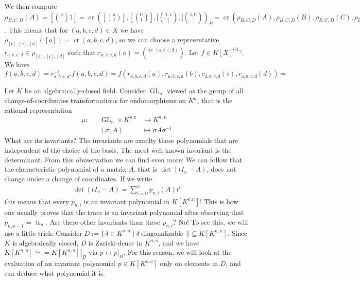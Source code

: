 \begin{example}
  We then compute $\rho_{B,C,D} (A) = [\binom{a},1] = \operatorname{cr}([\binom{a}{1}],[\binom{0}{1}],[\binom{1,1}],[\binom{1,0}])_P = \operatorname{cr}(\rho_{B,C,D}(A),\rho_{B,C,D}(B),\rho_{B,C,D}(C),\rho_{B,C,D}(D))_P = \operatorname{cr}(A,B,C,D)_P$.
  This means that for $(a,b,c,d) \in X$ we have $\rho_{[b],[c],[d]} ([a]) = \operatorname{cr}(a,b,c,d)$, so we can choose a representative $r_{a,b,c,d} \in \rho_{[b],[c],[d]}$ such that $r_{a,b,c,d}(a) = \binom{\operatorname{cr}(a,b,c,d)}{1}$.
  Let $f \in K[X]^{\operatorname{GL}_2}$.
  We have $f(a,b,c,d) = r_{a,b,c,d}^{-1}.f (a,b,c,d) = f(r_{a,b,c,d}(a),r_{a,b,c,d}(b),r_{a,b,c,d}(c),r_{a,b,c,d}(d)) = $
\end{example}

\begin{example}
  Let $K$ be an algebraically-closed field.
  Consider $\operatorname{GL}_n$ viewed as the group of all change-of-coordinates transformations for endomorphisms on $K^n$, that is the rational representation
  \begin{equation}
    \begin{aligned}
      \mu \colon && \operatorname{GL}_n \times K^{n.n} & \longrightarrow K^{n,n} \\
      && (\sigma,A) &\longmapsto \sigma A \sigma^{-1}
    \end{aligned}
  \end{equation}
  What are its invariants?
  The invariants are exaclty those polynomials that are independent of the choice of the basis.
  The most well-known invariant is the determinant.
  From this obvservation we can find even more:
  We can follow that the characteristic polynomial of a matrix $A$, that is $\operatorname{det} (tI_n - A)$, does not change under a change of coordinates.
  If we write
  \begin{equation}
    \begin{aligned}
      \operatorname{det} (tI_n - A) = \sum_{i=0}^n p_{n,i} (A) t^i
    \end{aligned}
  \end{equation}
  this means that every $p_{n,i}$ is an invariant polynomial in $K[K^{n.n}]$!
  This is how one usually proves that the trace is an invariant polynomial after observing that $p_{n,n-1} = \operatorname{tr}_n$.
  Are there other invariants than these $p_{n,i}$?
  No!
  To see this, we will use a little trick:
  Consider $D := \{\, \delta \in K^{n,n} \mid \delta \operatorname{diagonalizable} \,\} \subseteq K[K^{n,n}]$.
  Since $K$ is algebraically closed, $D$ is Zariski-dense in $K^{n,n}$, and we have $K[K^{n,n}] \simeq = \left. K[K^{n,n}] \right|_{D}$ via $p \leftrightarrow \left. p \right|_{D}$.
  For this reason, we will look at the evaluation of an invariant polynomial $p \in K[K^{n.n}] $ only on elements in $D$, and can deduce what polynomial it is.


\end{example}
